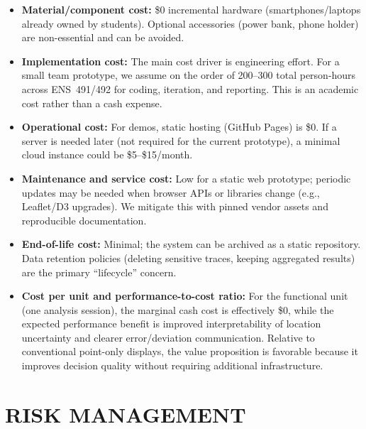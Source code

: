 \documentclass[12pt,a4paper]{article}
\begin{document}
\begin{itemize}[leftmargin=1.5em]
    \item \textbf{Material/component cost:} \$0 incremental hardware (smartphones/laptops already owned by students). Optional accessories (power bank, phone holder) are non-essential and can be avoided.
    \item \textbf{Implementation cost:} The main cost driver is engineering effort. For a small team prototype, we assume on the order of 200--300 total person-hours across ENS~491/492 for coding, iteration, and reporting. This is an academic cost rather than a cash expense.
    \item \textbf{Operational cost:} For demos, static hosting (GitHub Pages) is \$0. If a server is needed later (not required for the current prototype), a minimal cloud instance could be \$5--\$15/month.
    \item \textbf{Maintenance and service cost:} Low for a static web prototype; periodic updates may be needed when browser APIs or libraries change (e.g., Leaflet/D3 upgrades). We mitigate this with pinned vendor assets and reproducible documentation.
    \item \textbf{End-of-life cost:} Minimal; the system can be archived as a static repository. Data retention policies (deleting sensitive traces, keeping aggregated results) are the primary ``lifecycle'' concern.
    \item \textbf{Cost per unit and performance-to-cost ratio:} For the functional unit (one analysis session), the marginal cash cost is effectively \$0, while the expected performance benefit is improved interpretability of location uncertainty and clearer error/deviation communication. Relative to conventional point-only displays, the value proposition is favorable because it improves decision quality without requiring additional infrastructure.
\end{itemize}

\section{RISK MANAGEMENT}
\end{document}
